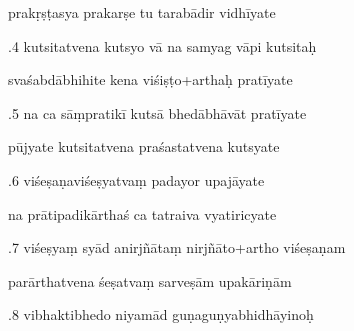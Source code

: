 \documentclass[article,12pt,a4paper]{memoir}%
\newcounter{parCount}
\begin{document}
	  
	  \pstart \leavevmode%
	prakṛṣṭasya prakarṣe tu tarabādir vidhīyate 
	{}
	\pend%
      

	  
	  \pstart {}.4 kutsitatvena kutsyo vā na samyag vāpi kutsitaḥ 
	{}
	\pend%
      

	  
	  \pstart \leavevmode%
	svaśabdābhihite kena viśiṣṭo+arthaḥ pratīyate 
	{}
	\pend%
      

	  
	  \pstart {}.5 na ca sāṃpratikī kutsā bhedābhāvāt pratīyate 
	{}
	\pend%
      

	  
	  \pstart \leavevmode%
	pūjyate kutsitatvena praśastatvena kutsyate 
	{}
	\pend%
      

	  
	  \pstart {}.6 viśeṣaṇaviśeṣyatvaṃ padayor upajāyate 
	{}
	\pend%
      

	  
	  \pstart \leavevmode%
	na prātipadikārthaś ca tatraiva vyatiricyate 
	{}
	\pend%
      

	  
	  \pstart {}.7 viśeṣyaṃ syād anirjñātaṃ nirjñāto+artho viśeṣaṇam 
	{}
	\pend%
      

	  
	  \pstart \leavevmode%
	parārthatvena śeṣatvaṃ sarveṣām upakāriṇām 
	{}
	\pend%
      

	  
	  \pstart {}.8 vibhaktibhedo niyamād guṇaguṇyabhidhāyinoḥ 
	{}
	\pend%
      
\end{document}
